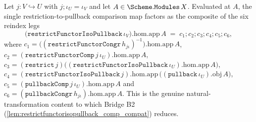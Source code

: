 \begin{lemma}\leanok
  \label{lem:restrictfunctorisopullback_comp_compat_hom}
  Let \(j : V \hookrightarrow U\) with \(j \mathbin{;} \iota_U = \iota_V\) and let
  \(A \in \Scheme.\mathtt{Modules}\,X\). Evaluated at \(A\), the single restriction-to-pullback
  comparison map factors as the composite of the six reindex legs
  \[
    \bigl(\mathtt{restrictFunctorIsoPullback}\,\iota_V\bigr).\mathrm{hom}.\mathrm{app}\,A
      \;=\; c_1 \mathbin{;} c_2 \mathbin{;} c_3 \mathbin{;} c_4 \mathbin{;} c_5 \mathbin{;} c_6,
  \]
  where
  \(c_1 = \bigl((\mathtt{restrictFunctorCongr}\,h_{j\iota})^{-1}\bigr).\mathrm{hom}.\mathrm{app}\,A\),
  \(c_2 = (\mathtt{restrictFunctorComp}\,j\,\iota_U).\mathrm{hom}.\mathrm{app}\,A\),
  \(c_3 = (\mathtt{restrict}\,j)\bigl((\mathtt{restrictFunctorIsoPullback}\,\iota_U).\mathrm{hom}.\mathrm{app}\,A\bigr)\),
  \(c_4 = (\mathtt{restrictFunctorIsoPullback}\,j).\mathrm{hom}.\mathrm{app}\,\bigl((\mathtt{pullback}\,\iota_U).\mathrm{obj}\,A\bigr)\),
  \(c_5 = (\mathtt{pullbackComp}\,j\,\iota_U).\mathrm{hom}.\mathrm{app}\,A\) and
  \(c_6 = (\mathtt{pullbackCongr}\,h_{j\iota}).\mathrm{hom}.\mathrm{app}\,A\). This is the genuine
  natural-transformation content to which Bridge B2
  (\cref{lem:restrictfunctorisopullback_comp_compat}) reduces.
\end{lemma}
